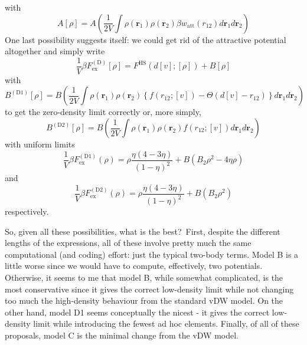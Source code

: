 \documentclass[aps,preprint]{revtex4-1}%
\begin{document}
with%
\begin{equation}
A\left[  \rho\right]  =A\left(  \frac{1}{2V}\int\rho\left(  \mathbf{r}%
_{1}\right)  \rho\left(  \mathbf{r}_{2}\right)  \beta w_{\text{att}}\left(
r_{12}\right)  d\mathbf{r}_{1}d\mathbf{r}_{2}\right)
\end{equation}
One last possibility suggests itself: we could get rid of the attractive
potential altogether and simply write%
\begin{equation}
\frac{1}{V}\beta F_{\text{ex}}^{\left(  \text{D}\right)  }\left[  \rho\right]
=F^{\text{HS}}\left(  d\left[  v\right]  ;\left[  \rho\right]  \right)
+B\left[  \rho\right]
\end{equation}
with%
\begin{equation}
B^{\left(  \text{D1}\right)  }\left[  \rho\right]  =B\left(  \frac{1}{2V}%
\int\rho\left(  \mathbf{r}_{1}\right)  \rho\left(  \mathbf{r}_{2}\right)
\left\{  f\left(  r_{12};\left[  v\right]  \right)  -\Theta\left(  d\left[
v\right]  -r_{12}\right)  \right\}  d\mathbf{r}_{1}d\mathbf{r}_{2}\right)
\end{equation}
to get the zero-density limit correctly or, more simply,
\begin{equation}
B^{\left(  \text{D2}\right)  }\left[  \rho\right]  =B\left(  \frac{1}{2V}%
\int\rho\left(  \mathbf{r}_{1}\right)  \rho\left(  \mathbf{r}_{2}\right)
f\left(  r_{12};\left[  v\right]  \right)  d\mathbf{r}_{1}d\mathbf{r}%
_{2}\right)
\end{equation}
with uniform limits%
\begin{equation}
\frac{1}{V}\beta F_{\text{ex}}^{\left(  \text{D1}\right)  }\left(
\rho\right)  =\rho\frac{\eta\left(  4-3\eta\right)  }{\left(  1-\eta\right)
^{2}}+B\left(  B_{2}\rho^{2}-4\eta\rho\right)
\end{equation}
and%
\begin{equation}
\frac{1}{V}\beta F_{\text{ex}}^{\left(  \text{D2}\right)  }\left(
\rho\right)  =\rho\frac{\eta\left(  4-3\eta\right)  }{\left(  1-\eta\right)
^{2}}+B\left(  B_{2}\rho^{2}\right)
\end{equation}
respectively.

So, given all these possibilities, what is the best?\ First, despite the
different lengths of the expressions, all of these involve pretty much the
same computational (and coding) effort: just the typical two-body terms. Model
B is a little worse since we would have to compute, effectively, two
potentials. Otherwise, it seems to me that model B, while somewhat
complicated, is the most conservative since it gives the correct low-density
limit while not changing too much the high-density behaviour from the standard
vDW model. On the other hand, model D1 seems conceptually the nicest - it
gives the correct low-density limit while introducing the fewest ad hoc
elements. Finally, of all of these proposals, model C is the minimal change
from the vDW model.
\end{document}
